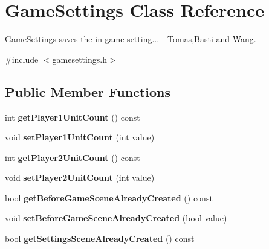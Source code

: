 \hypertarget{class_game_settings}{}\section{Game\+Settings Class Reference}
\label{class_game_settings}


\hyperlink{class_game_settings}{Game\+Settings} saves the in-\/game setting... -\/ Tomas,Basti and Wang.  




{\ttfamily \#include $<$gamesettings.\+h$>$}

\subsection*{Public Member Functions}
\begin{DoxyCompactItemize}
\item 
int {\bfseries get\+Player1\+Unit\+Count} () const \hypertarget{class_game_settings_ad6d3c2b54c8d1a4650ceaac7a6e69f3f}{}\label{class_game_settings_ad6d3c2b54c8d1a4650ceaac7a6e69f3f}

\item 
void {\bfseries set\+Player1\+Unit\+Count} (int value)\hypertarget{class_game_settings_ac23c69c7717039153d5b919a0e8ef46d}{}\label{class_game_settings_ac23c69c7717039153d5b919a0e8ef46d}

\item 
int {\bfseries get\+Player2\+Unit\+Count} () const \hypertarget{class_game_settings_a5484487465b67efc42d206bf328335e9}{}\label{class_game_settings_a5484487465b67efc42d206bf328335e9}

\item 
void {\bfseries set\+Player2\+Unit\+Count} (int value)\hypertarget{class_game_settings_a49a9f00fa1f4afea045cb723196e2e86}{}\label{class_game_settings_a49a9f00fa1f4afea045cb723196e2e86}

\item 
bool {\bfseries get\+Before\+Game\+Scene\+Already\+Created} () const \hypertarget{class_game_settings_a5e28792046b42ef08ceb9acb575fb263}{}\label{class_game_settings_a5e28792046b42ef08ceb9acb575fb263}

\item 
void {\bfseries set\+Before\+Game\+Scene\+Already\+Created} (bool value)\hypertarget{class_game_settings_a0fc66019f1439d6409fa579509243554}{}\label{class_game_settings_a0fc66019f1439d6409fa579509243554}

\item 
bool {\bfseries get\+Settings\+Scene\+Already\+Created} () const \hypertarget{class_game_settings_aeec233b1f2316d665e669b3fbd5605d0}{}\label{class_game_settings_aeec233b1f2316d665e669b3fbd5605d0}


\end{DoxyCompactItemize}
